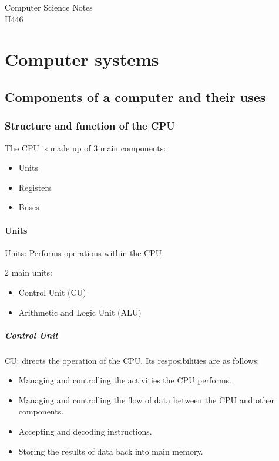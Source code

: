 \documentclass[a4paper]{report}
\begin{document}
\begin{titlepage}
	\raggedleft
	\vspace*{2cm}
	\Huge{Computer Science Notes}\\
	\vspace{0.5cm}
	\large{H446}
\end{titlepage}

\tableofcontents

\part{Computer systems}

\chapter{Components of a computer and their uses}

\section{Structure and function of the CPU}

The CPU is made up of 3 main components:

\begin{itemize}
	\item{Units}
	\item{Registers}
	\item{Buses}
\end{itemize}

\subsection{Units}

Units: Performs operations within the CPU.

2 main units:

\begin{itemize}
	\item{Control Unit (CU)}
	\item{Arithmetic and Logic Unit (ALU)}
\end{itemize}

\subsubsection{Control Unit}

CU: directs the operation of the CPU. Its resposibilities are as follows:

\begin{itemize}
	\item{Managing and controlling the activities the CPU performs.}
	\item{Managing and controlling the flow of data between the CPU and
		other components.}
	\item{Accepting and decoding instructions.}
	\item{Storing the results of data back into main memory.}
\end{itemize}
\end{document}
